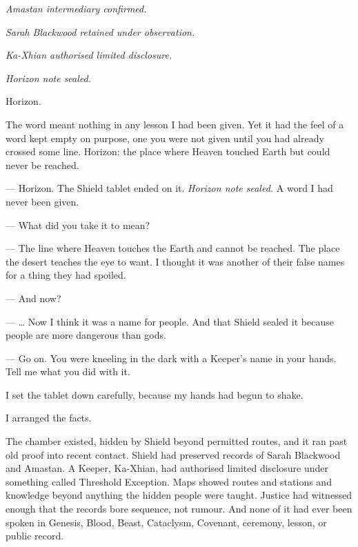 \textit{Amastan intermediary confirmed.}\par

\textit{Sarah Blackwood retained under observation.}\par

\textit{Ka-Xhian authorised limited disclosure.}\par

\textit{Horizon note sealed.}\par

Horizon.\par

The word meant nothing in any lesson I had been given. Yet it had the feel of a word kept empty on purpose, one you were not given until you had already crossed some line. Horizon: the place where Heaven touched Earth but could never be reached.\par

\ornament

\begin{room}

--- Horizon. The Shield tablet ended on it. \emph{Horizon note sealed.} A word I had never been given.

--- What did you take it to mean?

--- The line where Heaven touches the Earth and cannot be reached. The place the desert teaches the eye to want. I thought it was another of their false names for a thing they had spoiled.

--- And now?

--- \ldots{} Now I think it was a name for people. And that Shield sealed it because people are more dangerous than gods.

--- Go on. You were kneeling in the dark with a Keeper's name in your hands. Tell me what you did with it.

\end{room}

\ornament


I set the tablet down carefully, because my hands had begun to shake.\par

I arranged the facts.\par

The chamber existed, hidden by Shield beyond permitted routes, and it ran past old proof into recent contact. Shield had preserved records of Sarah Blackwood and Amastan. A Keeper, Ka-Xhian, had authorised limited disclosure under something called Threshold Exception. Maps showed routes and stations and knowledge beyond anything the hidden people were taught. Justice had witnessed enough that the records bore sequence, not rumour. And none of it had ever been spoken in Genesis, Blood, Beast, Cataclysm, Covenant, ceremony, lesson, or public record.\par


